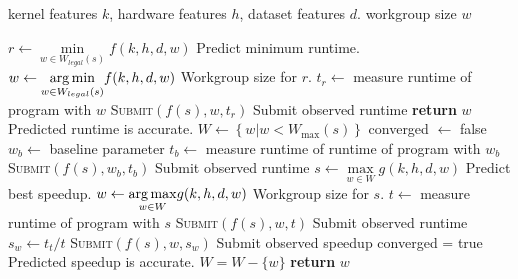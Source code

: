 \begin{algorithmic}[1]
  \Require kernel features $k$, hardware features $h$, dataset features $d$.
  \Ensure workgroup size $w$

  \State $r \leftarrow \underset{w \in W_{legal}(s)}{\min} f(k,h,d,w)$
  \Comment Predict minimum runtime.
  \State $w \leftarrow \underset{w \in W_{legal}(s)}{\operatorname*{arg\,min}} f(k,h,d,w)$
  \Comment Workgroup size for $r$.
  \State $t_r \leftarrow$ measure runtime of program with $w$
  \State \textsc{Submit}$\left( f(s), w, t_r \right)$
  \Comment Submit observed runtime
  \State \textbf{return} $w$
  \Comment Predicted runtime is accurate.
  \Else
  \State $W \leftarrow \left\{ w | w < W_{\max}(s) \right\}$
  \State converged $\leftarrow$ false
  \State $w_b \leftarrow$ baseline parameter
  \State $t_b \leftarrow$ measure runtime of runtime of program with
  $w_b$
  \State \textsc{Submit}$\left( f(s), w_b, t_b \right)$
  \Comment Submit observed runtime
  \State $s \leftarrow \underset{w \in W}{\max} g(k,h,d,w)$
  \Comment Predict best speedup.
  \State $w \leftarrow \underset{w \in W}{\operatorname*{arg\,max}} g(k,h,d,w)$
  \Comment Workgroup size for $s$.
  \State $t \leftarrow$ measure runtime of program with $s$
  \State \textsc{Submit}$\left( f(s), w, t \right)$
  \Comment Submit observed runtime
  \State $s_w \leftarrow t_t / t$
  \State \textsc{Submit}$\left( f(s), w, s_w \right)$
  \Comment Submit observed speedup
  \State converged = true
  \Comment Predicted speedup is accurate.
  \Else
  \State $W = W - \{ w \}$
  \EndIf
  \EndWhile
  \State \textbf{return} $w$
  \EndIf
\end{algorithmic}
